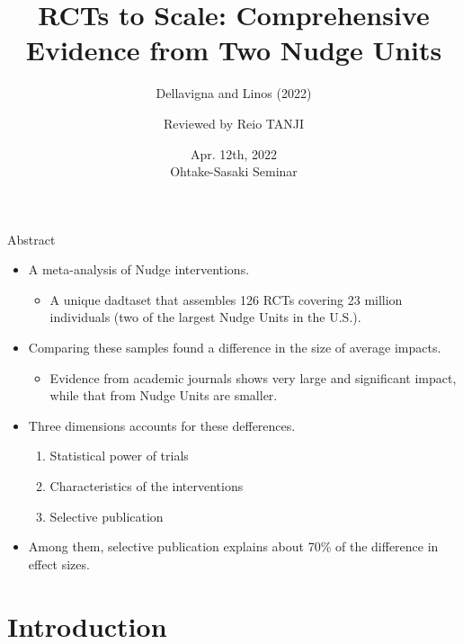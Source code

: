 \documentclass[dvipdfmx,11pt]{beamer}
\title[Dellavigna and Linos (2022, Econometrica)]{RCTs to Scale: Comprehensive Evidence from Two Nudge Units}
\subtitle{Dellavigna and Linos (2022)}
\author{Reviewed by Reio TANJI}
\date{Apr. 12th, 2022 \\ Ohtake-Sasaki Seminar}
\institute[]{Osaka University, Graduate School of Economics}
\begin{document}
\begin{frame}\frametitle{}
\titlepage
\end{frame}

\begin{frame}{Abstract}
  \begin{itemize}
    \item A meta-analysis of Nudge interventions.
    \begin{itemize}
      \item A unique dadtaset that assembles 126 RCTs covering 23 million individuals (two of the largest Nudge Units in the U.S.).
    \end{itemize}
    \item Comparing these samples found a difference in the size of average impacts.
    \begin{itemize}
      \item Evidence from academic journals shows very large and significant impact, while that from Nudge Units are smaller.
    \end{itemize}
    \item Three dimensions accounts for these defferences.
    \begin{enumerate}
      \item Statistical power of trials
      \item Characteristics of the interventions
      \item Selective publication
    \end{enumerate}
    \item Among them, selective publication explains about 70\% of the difference in effect sizes.
  \end{itemize}
\end{frame}

\section{Introduction}
\frame{\sectionpage}
\end{document}
